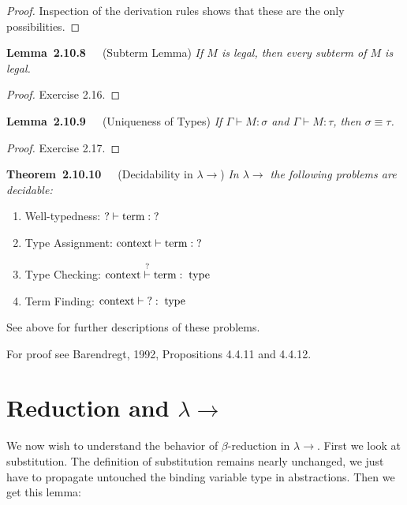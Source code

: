 \documentclass[letterpaper]{article}
\newenvironment{theorem}[2][]{\par\medskip
	\noindent \textbf{Theorem~#2}~~~#1 \rmfamily\em}{\medskip}
\newenvironment{lemma}[2][]{\par\medskip
	\noindent \textbf{Lemma~#2}~~~#1 \rmfamily\em}{\medskip}
\newcommand{\larr}{\lambda \!\! \rightarrow}
\begin{document}
\begin{proof}
	Inspection of the derivation rules shows that these are the only possibilities.
\end{proof}

\begin{lemma}[(Subterm Lemma)]{2.10.8}
	If $M$ is legal, then every subterm of $M$ is legal.
\end{lemma}

\begin{proof}
	Exercise 2.16.
\end{proof}

\begin{lemma}[(Uniqueness of Types)]{2.10.9}
	If $\Gamma \vdash M : \sigma$ and $\Gamma \vdash M : \tau$, then $\sigma \equiv \tau$.
\end{lemma}

\begin{proof}
	Exercise 2.17.
\end{proof}

\begin{theorem}[(Decidability in $\larr$)]{2.10.10}
	In $\larr$ the following problems are decidable:
	\begin{enumerate}
		\item Well-typedness: $? \vdash \textrm{\normalfont term} : \; ?$
		\item Type Assignment: $\textrm{\normalfont context} \vdash \textrm{\normalfont term} : \; ?$
		\item Type Checking: $\textrm{\normalfont context} \overset{?}{\vdash} \textrm{\normalfont term} : \; \textrm{\normalfont type}$
		\item Term Finding: $\textrm{\normalfont context} \vdash \; ? : \; \textrm{\normalfont type}$
	\end{enumerate}
	See above for further descriptions of these problems.
\end{theorem}

For proof see Barendregt, 1992, Propositions 4.4.11 and 4.4.12.

\section{Reduction and $\larr$}

We now wish to understand the behavior of $\beta$-reduction in $\larr$. First we look at substitution. The definition of substitution remains nearly unchanged, we just have to propagate untouched the binding variable type in abstractions. Then we get this lemma:
\end{document}

